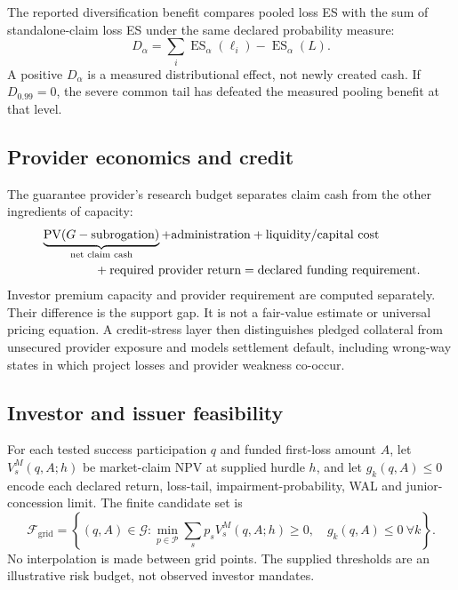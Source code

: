 \documentclass[11pt,a4paper]{article}
\begin{document}
The reported diversification benefit compares pooled loss ES with the sum of standalone-claim loss ES under the same declared probability measure:
\begin{equation}
D_{\alpha}=\sum_i \operatorname{ES}_{\alpha}(\ell_i)-\operatorname{ES}_{\alpha}(L).
\end{equation}
A positive \(D_{\alpha}\) is a measured distributional effect, not newly created cash. If \(D_{0.99}=0\), the severe common tail has defeated the measured pooling benefit at that level.

\subsection{Provider economics and credit}

The guarantee provider's research budget separates claim cash from the other ingredients of capacity:
\begin{equation}
\begin{aligned}
&\underbrace{\operatorname{PV}(G-\text{subrogation})}_{\text{net claim cash}}
+\text{administration}+\text{liquidity/capital cost}\\
&\hspace{15mm}+\text{required provider return}
=\text{declared funding requirement}.
\end{aligned}
\label{eq:provider}
\end{equation}
Investor premium capacity and provider requirement are computed separately. Their difference is the support gap. It is not a fair-value estimate or universal pricing equation. A credit-stress layer then distinguishes pledged collateral from unsecured provider exposure and models settlement default, including wrong-way states in which project losses and provider weakness co-occur.

\subsection{Investor and issuer feasibility}

For each tested success participation \(q\) and funded first-loss amount \(A\), let \(V^M_s(q,A;h)\) be market-claim NPV at supplied hurdle \(h\), and let \(g_k(q,A)\leq0\) encode each declared return, loss-tail, impairment-probability, WAL and junior-concession limit. The finite candidate set is
\begin{equation}
\mathcal F_{\mathrm{grid}}=\left\{(q,A)\in\mathcal G:
\min_{p\in\mathcal P}\sum_s p_sV^M_s(q,A;h)\geq0,
\quad g_k(q,A)\leq0\ \forall k\right\}.
\label{eq:feasible-grid}
\end{equation}
No interpolation is made between grid points. The supplied thresholds are an illustrative risk budget, not observed investor mandates.
\end{document}

